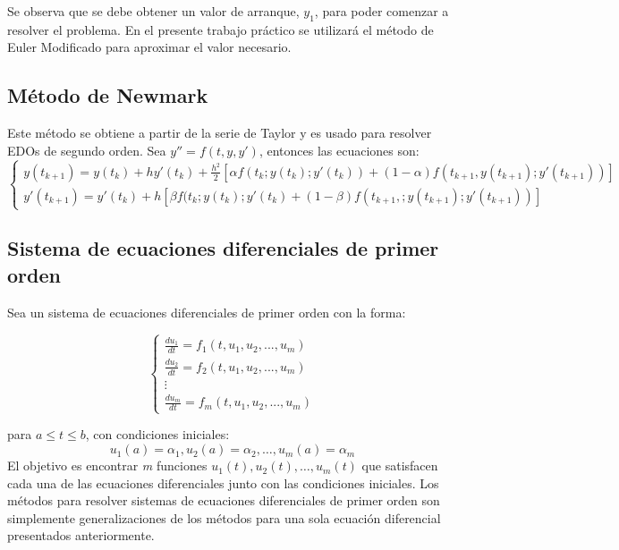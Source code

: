 \documentclass[titlepage,a4paper]{article}
\begin{document}
	Se observa que se debe obtener un valor de arranque, $ y_1 $, para poder comenzar a resolver el problema. En el presente trabajo práctico se utilizará el método de Euler Modificado para aproximar el valor necesario. 

	\subsection{Método de Newmark}
	Este método se obtiene a partir de la serie de Taylor y es usado para resolver EDOs de segundo orden.
	Sea $ y'' = f(t, y, y') $, entonces las ecuaciones son:
	\begin{equation}
		\begin{cases}
		y(t_{k+1}) = y(t_{k}) + hy'(t_{k}) + \frac{h^2}{2}[\alpha f(t_{k}; y(t_{k});y'(t_{k})) + (1 - \alpha) f(t_{k+1}, y(t_{k+1}); y'(t_{k+1}))]\\
		y'(t_{k+1}) = y'(t_{k}) + h[\beta f(t_{k}; y(t_{k}); y'(t_{k}) + (1-\beta)f(t_{k+1},;y(t_{k+1});y'(t_{k+1}))]
		\end{cases}
	\end{equation}

	\subsection{Sistema de ecuaciones diferenciales de primer orden}\cite{burden_system_diff_eq}
		Sea un sistema de ecuaciones diferenciales de primer orden con la forma:

		\begin{equation}
			\label{eq1}
			\begin{cases}
				\frac{du_{1}}{dt}=f_{1}(t,u_{1},u_{2},...,u_{m})\\
				\frac{du_{2}}{dt}=f_{2}(t,u_{1},u_{2},...,u_{m})\\
				\vdots\\
				\frac{du_{m}}{dt}=f_{m}(t,u_{1},u_{2},...,u_{m})
			\end{cases}
		\end{equation}

		para $a \leq t \leq b$, con condiciones iniciales:
		\begin{equation}
			\label{eq2}
			u_{1}(a) = \alpha_{1}, u_{2}(a)=\alpha_{2}, \dots, u_{m}(a)=\alpha_{m}
		\end{equation}
		El objetivo es encontrar \emph{m} funciones $u_{1}(t),u_{2}(t),\dots,u_{m}(t)$ que satisfacen 
		cada una de las ecuaciones diferenciales junto con las condiciones iniciales.
		Los métodos para resolver sistemas de ecuaciones diferenciales de primer orden son simplemente 
		generalizaciones de los métodos para una sola ecuación diferencial presentados anteriormente.
\end{document}

